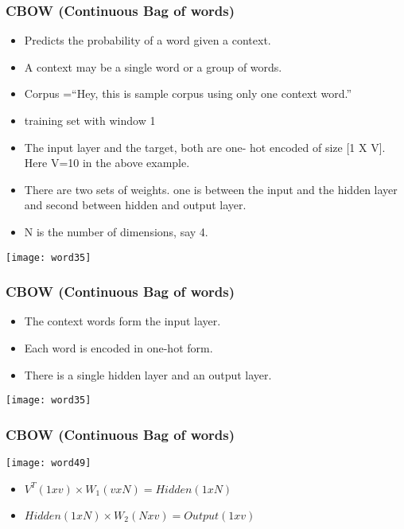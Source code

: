 \begin{frame}[fragile]\frametitle{CBOW (Continuous Bag of words)}
\begin{itemize}
\item Predicts the probability of a word given a context. 
\item A context may be a single word or a group of words. 
\item  Corpus =``Hey, this is sample corpus using only one context word.''
\item training set with window 1
\item The input layer and the target, both are one- hot encoded of size [1 X V]. Here V=10 in the above example.
\item There are two sets of weights. one is between the input and the hidden layer and second between hidden and output layer.
\item N is the number of dimensions, say 4.
\end{itemize}
\begin{center}
\texttt{[image: word35]}
\end{center}
\end{frame}

\begin{frame}[fragile]\frametitle{CBOW (Continuous Bag of words)}
\begin{itemize}
\item The context words form the input layer. 
\item Each word is encoded in one-hot form.
\item There is a single hidden layer and an output layer.
\end{itemize}
\begin{center}
\texttt{[image: word35]}
\end{center}

\end{frame}

\begin{frame}[fragile]\frametitle{CBOW (Continuous Bag of words)}

\begin{center}
\texttt{[image: word49]}
\end{center}
\begin{itemize}
\item $V^T(1xv) \times W_1(vxN) = Hidden(1xN)$
\item $Hidden(1xN)  \times W_2(Nxv) = Output(1xv)$
\end{itemize}
\end{frame}

